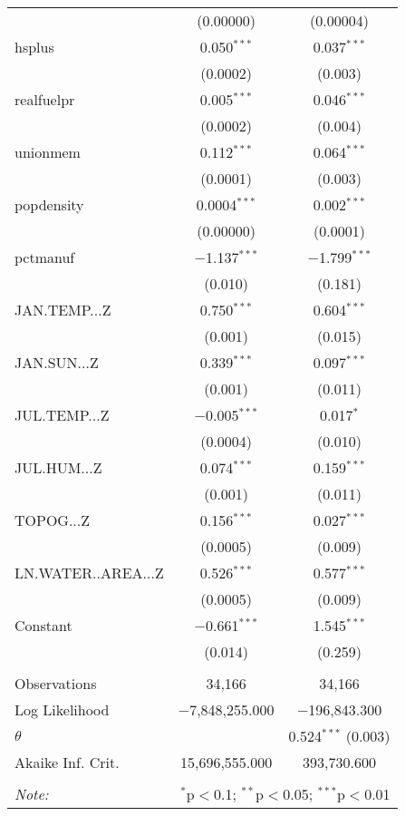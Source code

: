 \begin{table}[!htbp]
\begin{tabular}{@{\extracolsep{5pt}}lcc}
  & (0.00000) & (0.00004) \\ 
  hsplus & 0.050$^{***}$ & 0.037$^{***}$ \\ 
  & (0.0002) & (0.003) \\ 
  realfuelpr & 0.005$^{***}$ & 0.046$^{***}$ \\ 
  & (0.0002) & (0.004) \\ 
  unionmem & 0.112$^{***}$ & 0.064$^{***}$ \\ 
  & (0.0001) & (0.003) \\ 
  popdensity & 0.0004$^{***}$ & 0.002$^{***}$ \\ 
  & (0.00000) & (0.0001) \\ 
  pctmanuf & $-$1.137$^{***}$ & $-$1.799$^{***}$ \\ 
  & (0.010) & (0.181) \\ 
  JAN.TEMP...Z & 0.750$^{***}$ & 0.604$^{***}$ \\ 
  & (0.001) & (0.015) \\ 
  JAN.SUN...Z & 0.339$^{***}$ & 0.097$^{***}$ \\ 
  & (0.001) & (0.011) \\ 
  JUL.TEMP...Z & $-$0.005$^{***}$ & 0.017$^{*}$ \\ 
  & (0.0004) & (0.010) \\ 
  JUL.HUM...Z & 0.074$^{***}$ & 0.159$^{***}$ \\ 
  & (0.001) & (0.011) \\ 
  TOPOG...Z & 0.156$^{***}$ & 0.027$^{***}$ \\ 
  & (0.0005) & (0.009) \\ 
  LN.WATER..AREA...Z & 0.526$^{***}$ & 0.577$^{***}$ \\ 
  & (0.0005) & (0.009) \\ 
  Constant & $-$0.661$^{***}$ & 1.545$^{***}$ \\ 
  & (0.014) & (0.259) \\ 
 \hline \\[-1.8ex] 
Observations & 34,166 & 34,166 \\ 
Log Likelihood & $-$7,848,255.000 & $-$196,843.300 \\ 
$\theta$ &  & 0.524$^{***}$  (0.003) \\ 
Akaike Inf. Crit. & 15,696,555.000 & 393,730.600 \\ 
\hline 
\hline \\[-1.8ex] 
\textit{Note:}  & \multicolumn{2}{r}{$^{*}$p$<$0.1; $^{**}$p$<$0.05; $^{***}$p$<$0.01} \\ 
\end{tabular} 
\end{table} 
